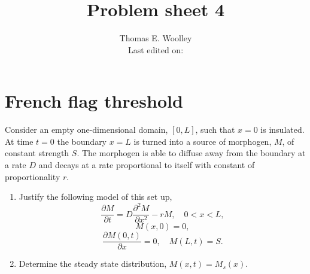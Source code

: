 \documentclass[10pt]{article}
\newcommand{\bb}{\begin{equation}}
\newcommand{\ee}{\end{equation}}
\newcommand{\D}[2]{\frac{\partial #1}{\partial #2}}
\newcommand{\DD}[2]{\frac{\partial^2 #1}{\partial #2^2}}
\newcounter{Counter1}
\begin{document}


\title{Problem sheet 4}
\author{Thomas E. Woolley\\Last edited on:}
\maketitle
\section{French flag threshold}\label{French flag threshold}
Consider an empty one-dimensional domain, $[0,L]$, such that $x=0$ is insulated. At time $t=0$ the boundary $x=L$ is turned into a source of morphogen, $M$, of constant strength $S$. The morphogen is able to diffuse away from the boundary at a rate $D$ and decays at a rate proportional to itself with constant of proportionality $r$.
\begin{enumerate}
\item Justify the following model of this set up,
\bb
\D{M}{t}=D\DD{M}{x}-rM,\quad 0<x<L,\label{Diffusion}
\ee\bb
M(x,0)=0,
\ee\bb
\D{M(0,t)}{x}=0,\quad M(L,t)=S.
\ee

\item Determine the steady state distribution, $M(x,t)=M_s(x)$.
\setcounter{Counter1}{\value{enumi}}
\end{enumerate}
\end{document}
